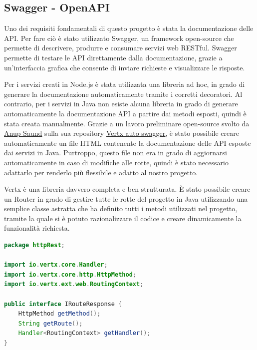 \subsection{Swagger - OpenAPI}

Uno dei requisiti fondamentali di questo progetto è stata la documentazione delle API.
Per fare ciò è stato utilizzato Swagger, un framework open-source che permette di descrivere, produrre e consumare servizi web RESTful. 
Swagger permette di testare le API direttamente dalla documentazione, grazie a un'interfaccia grafica che consente di inviare richieste e visualizzare le risposte.

\vspace{1cm}

Per i servizi creati in Node.js è stata utilizzata una libreria ad hoc, in grado di generare la documentazione automaticamente tramite i corretti decoratori.
Al contrario, per i servizi in Java non esiste alcuna libreria in grado di generare automaticamente la documentazione API a partire dai metodi esposti, quindi è stata creata manualmente.
Grazie a un lavoro preliminare open-source svolto da \href{https://github.com/anupsaund}{\underline{Anup Saund}} sulla sua repository \href{https://github.com/anupsaund/vertx-auto-swagger}{\underline{Vertx auto swagger}}, è stato possibile creare automaticamente un file HTML contenente la documentazione delle API esposte dai servizi in Java. 
Purtroppo, questo file non era in grado di aggiornarsi automaticamente in caso di modifiche alle rotte, quindi è stato necessario adattarlo per renderlo più flessibile e adatto al nostro progetto.

\vspace{1cm}

Vertx è una libreria davvero completa e ben strutturata. È stato possibile creare un Router in grado di gestire tutte le rotte del progetto in Java utilizzando una semplice classe astratta che ha definito tutti i metodi utilizzati nel progetto, tramite la quale si è potuto razionalizzare il codice e creare dinamicamente la funzionalità richiesta.

\begin{lstlisting}[language=Java, caption={Semplice interfaccia per le rotte HTTP}, label=list:java_swagger_interface]
package httpRest;

import io.vertx.core.Handler;
import io.vertx.core.http.HttpMethod;
import io.vertx.ext.web.RoutingContext;

public interface IRouteResponse {
    HttpMethod getMethod();
    String getRoute();
    Handler<RoutingContext> getHandler();
}
\end{lstlisting}

